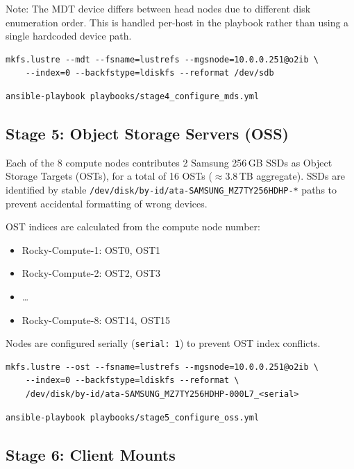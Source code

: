 Note: The MDT device differs between head nodes due to different disk enumeration order. This is handled per-host in the playbook rather than using a single hardcoded device path.

\begin{verbatim}
mkfs.lustre --mdt --fsname=lustrefs --mgsnode=10.0.0.251@o2ib \
    --index=0 --backfstype=ldiskfs --reformat /dev/sdb
\end{verbatim}

\begin{verbatim}
ansible-playbook playbooks/stage4_configure_mds.yml
\end{verbatim}

\subsection{Stage 5: Object Storage Servers (OSS)}

Each of the 8 compute nodes contributes 2 Samsung 256\,GB SSDs as Object Storage Targets (OSTs), for a total of 16 OSTs ($\approx$3.8\,TB aggregate). SSDs are identified by stable \texttt{/dev/disk/by-id/ata-SAMSUNG\_MZ7TY256HDHP-*} paths to prevent accidental formatting of wrong devices.

OST indices are calculated from the compute node number:
\begin{itemize}
    \item Rocky-Compute-1: OST0, OST1
    \item Rocky-Compute-2: OST2, OST3
    \item \ldots
    \item Rocky-Compute-8: OST14, OST15
\end{itemize}

Nodes are configured serially (\texttt{serial: 1}) to prevent OST index conflicts.

\begin{verbatim}
mkfs.lustre --ost --fsname=lustrefs --mgsnode=10.0.0.251@o2ib \
    --index=0 --backfstype=ldiskfs --reformat \
    /dev/disk/by-id/ata-SAMSUNG_MZ7TY256HDHP-000L7_<serial>
\end{verbatim}

\begin{verbatim}
ansible-playbook playbooks/stage5_configure_oss.yml
\end{verbatim}

\subsection{Stage 6: Client Mounts}

